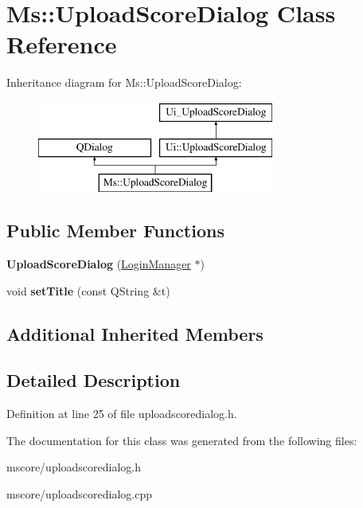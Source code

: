 \hypertarget{class_ms_1_1_upload_score_dialog}{}\section{Ms\+:\+:Upload\+Score\+Dialog Class Reference}
\label{class_ms_1_1_upload_score_dialog}
Inheritance diagram for Ms\+:\+:Upload\+Score\+Dialog\+:\begin{figure}[H]
\begin{center}
\leavevmode
\includegraphics[height=3.000000cm]{class_ms_1_1_upload_score_dialog}
\end{center}
\end{figure}
\subsection*{Public Member Functions}
\begin{DoxyCompactItemize}
\item 
\mbox{\label{class_ms_1_1_upload_score_dialog_a71baeb38b160d64abf04e441951be383}} 
{\bfseries Upload\+Score\+Dialog} (\hyperlink{class_ms_1_1_login_manager}{Login\+Manager} $\ast$)
\item 
\mbox{\label{class_ms_1_1_upload_score_dialog_a7ab6f78fc2c8894a4acb88a00856faa9}} 
void {\bfseries set\+Title} (const Q\+String \&t)
\end{DoxyCompactItemize}
\subsection*{Additional Inherited Members}


\subsection{Detailed Description}


Definition at line 25 of file uploadscoredialog.\+h.



The documentation for this class was generated from the following files\+:\begin{DoxyCompactItemize}
\item 
mscore/uploadscoredialog.\+h\item 
mscore/uploadscoredialog.\+cpp\end{DoxyCompactItemize}
